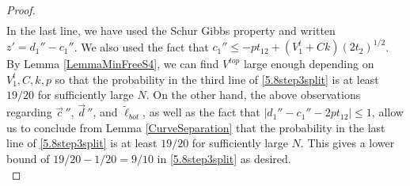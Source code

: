 \begin{proof}
\begin{equation}
\begin{split}
	\end{split}
	\end{equation}
	In the last line, we have used the Schur Gibbs property and written $z' = d_1'' - c_1''$. We also used the fact that $c_1'' \leq -pt_{12} + (V_1^t + Ck)(2t_2)^{1/2}$. By Lemma \ref{LemmaMinFreeS4}, we can find $V^{top}$ large enough depending on $V_1^t,C,k,p$ so that the probability in the third line of \eqref{5.8step3split} is at least $19/20$ for sufficiently large $N$. On the other hand, the above observations regarding $\vec{c}\,''$, $\vec{d}\,''$, and $\tilde{\ell}_{bot}$, as well as the fact that $|d_1'' - c_1'' - 2pt_{12}| \leq 1$, allow us to conclude from Lemma \ref{CurveSeparation} that the probability in the last line of \eqref{5.8step3split} is at least $19/20$ for sufficiently large $N$. This gives a lower bound of $19/20 - 1/20 = 9/10$ in \eqref{5.8step3split} as desired.\\
	

\end{proof}
